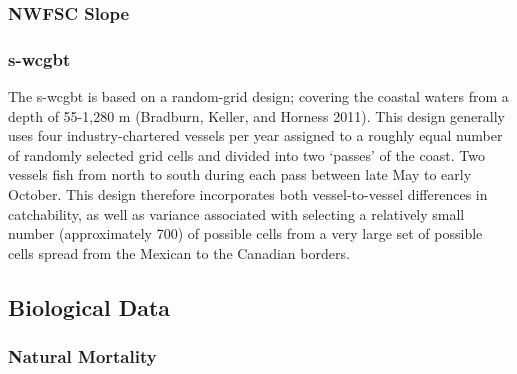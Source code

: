 \documentclass[11pt,
  english,
  a4paper,
]{article}
\begin{document}
\leavevmode\tagmcend\tagstructend\par


\hypertarget{nwfsc-slope-1}{%
\subsubsection{NWFSC Slope}\label{nwfsc-slope-1}}

\leavevmode\tagmcend\tagstructend


\hypertarget{section-1}{%
\subsubsection{\texorpdfstring{\acrlong{s-wcgbt}}{}}\label{section-1}}

\leavevmode\tagmcend\tagstructend


The \Gls{s-wcgbt} is based on a random-grid design; covering the coastal waters from a depth of 55-1,280 m {(Bradburn, Keller, and Horness 2011)\leavevmode\tagmcend\tagstructend}. This design generally uses four industry-chartered vessels per year assigned to a roughly equal number of randomly selected grid cells and divided into two `passes' of the coast. Two vessels fish from north to south during each pass between late May to early October. This design therefore incorporates both vessel-to-vessel differences in catchability, as well as variance associated with selecting a relatively small number (approximately 700) of possible cells from a very large set of possible cells spread from the Mexican to the Canadian borders.

\leavevmode\tagmcend\tagstructend\par


\hypertarget{biological-data}{%
\subsection{Biological Data}\label{biological-data}}

\leavevmode\tagmcend\tagstructend


\hypertarget{natural-mortality}{%
\subsubsection{Natural Mortality}\label{natural-mortality}}
\end{document}
